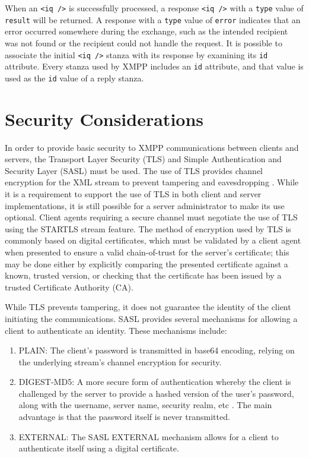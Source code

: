 When an \texttt{<iq />} is successfully processed, a response \texttt{<iq />}
with a \texttt{type} value of \texttt{result} will be returned. A response
with a \texttt{type} value of \texttt{error} indicates that an error occurred
somewhere during the exchange, such as the intended recipient was not found or
the recipient could not handle the request. It is possible to associate the
initial \texttt{<iq />} stanza with its response by examining its \texttt{id}
attribute. Every stanza used by XMPP includes an \texttt{id} attribute, and that
value is used as the \texttt{id} value of a reply stanza.

\section{Security Considerations}
\label{sec:Security-Considerations}

In order to provide basic security to XMPP communications between clients
and servers, the Transport Layer Security (TLS) \cite{TLS} and Simple Authentication
and Security Layer (SASL) \cite{SASL} must be used. The use of TLS provides
channel encryption for the XML stream to prevent tampering and eavesdropping \cite{RFC3920}.
While it is a requirement to support the use of TLS in both client and server 
implementations, it is still possible for a server administrator to make its
use optional. Client agents requiring a secure channel must negotiate the use
of TLS using the STARTLS \cite{RFC3920} stream feature. The method of encryption
used by TLS is commonly based on digital certificates, which must be validated
by a client agent when presented to ensure a valid chain-of-trust for the
server's certificate; this may be done either by explicitly comparing the presented
certificate against a known, trusted version, or checking that the certificate
has been issued by a trusted Certificate Authority (CA).

While TLS prevents tampering, it does not guarantee the identity of the client
initiating the communications. SASL provides several mechanisms for allowing
a client to authenticate an identity. These mechanisms include:
\begin{enumerate}
\item PLAIN: The client's password is transmitted in base64 encoding, relying
on the underlying stream's channel encryption for security.
\item DIGEST-MD5: A more secure form of authentication whereby the client is
challenged by the server to provide a hashed version of the user's password,
along with the username, server name, security realm, etc \cite{RFC2831}. The
main advantage is that the password itself is never transmitted.
\item EXTERNAL: The SASL EXTERNAL mechanism allows for a client to authenticate
itself using a digital certificate.
\end{enumerate}

